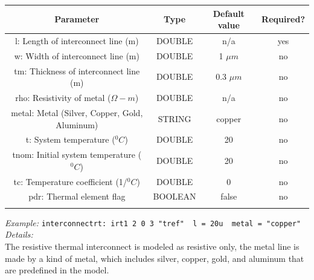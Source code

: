 \documentclass{article}
\begin{document}
\begin{table}[H]
\begin{tabular}{|c|c|c|c|}
\hline
Parameter&Type&Default value&Required?\\
\hline
l: Length of interconnect line (m) & DOUBLE &  n/a & yes \\
\hline
w: Width of interconnect line (m) & DOUBLE & 1 $\mu m$ & no \\
\hline
tm: Thickness of interconnect line (m) & DOUBLE & 0.3 $\mu m$  & no \\
\hline
rho: Resistivity of metal  ($\Omega-m$)& DOUBLE & n/a & no \\
\hline
metal: Metal (Silver, Copper, Gold, Aluminum) & STRING & copper & no \\
\hline
t: System temperature ($^0C$) & DOUBLE & 20 & no \\
\hline
tnom: Initial system temperature ($^0C$) & DOUBLE & 20 & no \\
\hline
tc: Temperature coefficient (1/$^0C$) & DOUBLE & 0 & no \\
\hline
pdr:  Thermal element flag & BOOLEAN & false & no \\
\par
\hline
\end{tabular}
\end{table}
\noindent\myThickLine
\newline
\textit{Example:}
\newline
\texttt{interconnectrt:\ irt1\ 2\ 0\ 3\ "tref" \ l = 20u \ metal = "copper"}
\newline
\myThickLine
\textit{Details:}\\
The resistive thermal interconnect is modeled as resistive only, the metal line is made by a kind of metal, which includes silver, copper, gold, and aluminum that are predefined in the model. \\
\end{document}
